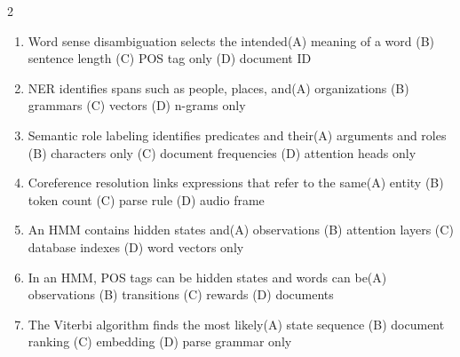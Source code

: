 \documentclass[a4paper]{article}
\begin{document}
\begin{multicols*}{2}
\fontsize{8.5}{10}\selectfont
\begin{enumerate}[resume]
\item Word sense disambiguation selects the intended\newline\hspace*{0.6em}(A) meaning of a word \quad (B) sentence length \newline\hspace*{0.6em}(C) POS tag only \quad (D) document ID
\item NER identifies spans such as people, places, and\newline\hspace*{0.6em}(A) organizations \quad (B) grammars \newline\hspace*{0.6em}(C) vectors \quad (D) n-grams only
\item Semantic role labeling identifies predicates and their\newline\hspace*{0.6em}(A) arguments and roles \quad (B) characters only \newline\hspace*{0.6em}(C) document frequencies \quad (D) attention heads only
\item Coreference resolution links expressions that refer to the same\newline\hspace*{0.6em}(A) entity \quad (B) token count \newline\hspace*{0.6em}(C) parse rule \quad (D) audio frame
\item An HMM contains hidden states and\newline\hspace*{0.6em}(A) observations \quad (B) attention layers \newline\hspace*{0.6em}(C) database indexes \quad (D) word vectors only
\item In an HMM, POS tags can be hidden states and words can be\newline\hspace*{0.6em}(A) observations \quad (B) transitions \newline\hspace*{0.6em}(C) rewards \quad (D) documents
\item The Viterbi algorithm finds the most likely\newline\hspace*{0.6em}(A) state sequence \quad (B) document ranking \newline\hspace*{0.6em}(C) embedding \quad (D) parse grammar only

\end{enumerate}
\end{multicols*}
\end{document}
